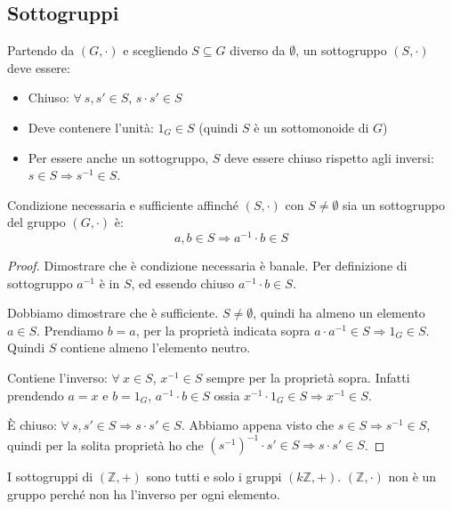 \subsection{Sottogruppi}

\begin{defn}[Sottogruppo]
Partendo da $(G, \cdot)$ e scegliendo $S \subseteq G$ diverso da $\emptyset$, un sottogruppo $(S, \cdot)$ deve essere:
\begin{itemize}
    \item Chiuso: $\forall \ s, s' \in S$, $s \cdot s' \in S$
    \item Deve contenere l'unit\`a: $1_G \in S$ (quindi $S$ \`e un sottomonoide di $G$)
    \item Per essere anche un sottogruppo, $S$ deve essere chiuso rispetto agli inversi: $s \in S \Rightarrow s^{-1} \in S$.
\end{itemize}
\end{defn}
\begin{prop}
Condizione necessaria e sufficiente affinch\'e $(S, \cdot)$ con $S \neq \emptyset$ sia un sottogruppo del gruppo $(G, \cdot)$ \`e:
\[
a, b \in S \Rightarrow a^{-1} \cdot  b \in S
\]
\end{prop}
\begin{proof}
Dimostrare che \`e condizione necessaria \`e banale. Per definizione di sottogruppo $a^{-1}$ \`e in $S$, ed essendo chiuso $a^{-1} \cdot b \in S$.

Dobbiamo dimostrare che \`e sufficiente. $S \neq \emptyset$, quindi ha almeno un elemento $a \in S$. Prendiamo $b = a $, per la propriet\`a indicata sopra $a \cdot a^{-1} \in S \Rightarrow 1_G \in S$. Quindi $S$ contiene almeno l'elemento neutro.

Contiene l'inverso: $\forall \ x \in S $, $ x^{-1} \in S$ sempre per la propriet\`a sopra. Infatti prendendo $a = x$ e $b = 1_G$, $a^{-1} \cdot b \in S$ ossia $x^{-1} \cdot 1_G \in S \Rightarrow x^{-1} \in S$.

\`E chiuso: $\forall \ s, s' \in S \Rightarrow s \cdot s' \in S$. Abbiamo appena visto che $s \in S \Rightarrow s^{-1} \in S$, quindi per la solita propriet\`a ho che $(s^{-1})^{-1} \cdot s' \in S \Rightarrow s \cdot s' \in S$.
\end{proof}



I sottogruppi di $(\mathbb{Z}, +)$ sono tutti e solo i gruppi $(k \mathbb{Z}, +)$. $(\mathbb{Z}, \cdot)$ non \`e un gruppo perch\'e non ha l'inverso per ogni elemento.

